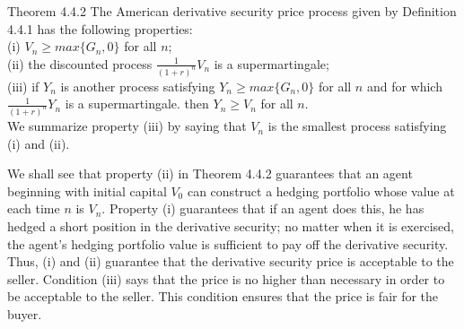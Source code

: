 \documentclass[c, dvipsnames, 8pt]{beamer}
\begin{document}
\begin{frame}[shrink=5]

\frametitle{\insertsection} 
\framesubtitle{\insertsubsection} 


\begin{block}{Theorem 4.4.2}
	The American derivative security price process given by Definition 4.4.1 has the following properties:\\
	(i) $V_n\ge max\{G_n,0\}$ for all $n$;\\
	(ii) the discounted process $\frac{1}{(1+r)^n}V_n$ is a supermartingale;\\
	(iii) if $Y_n$ is another process satisfying $Y_n \ge max\{G_n,0\}$ for all $n$ and for which $\frac{1}{(1+r)^n}Y_n$ is a supermartingale. then $Y_n \ge V_n$ for all $n$.\\
	
	We summarize property (iii) by saying that $V_n$ is the smallest process satisfying (i) and (ii). 
\end{block}

We shall see that property (ii) in Theorem 4.4.2 guarantees that an agent beginning with initial capital $V_0$ can construct a hedging portfolio whose value at each time $n$ is $V_n$. Property (i) guarantees that if an agent does this, he has hedged a short position in the derivative security; no matter when it is exercised, the agent's hedging portfolio value is sufficient to pay off the derivative security. Thus, (i) and (ii) guarantee that the derivative security price is acceptable to the seller. Condition (iii) says that the price is no higher than necessary in order to be acceptable to the seller. This condition ensures that the price is fair for the buyer.

\end{frame}
\end{document}
